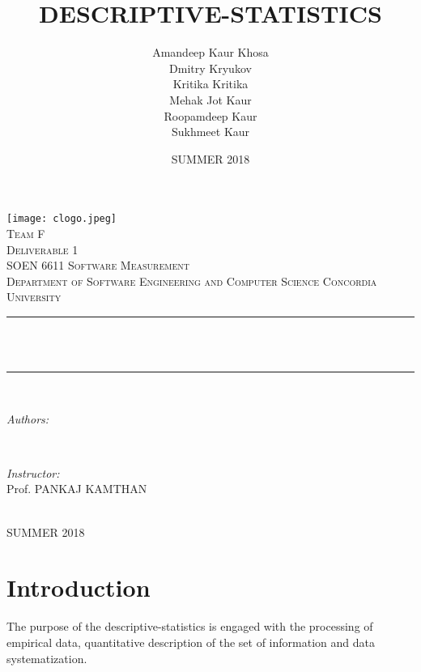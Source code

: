 \documentclass[12pt]{article}
\title{DESCRIPTIVE-STATISTICS}
\date{SUMMER 2018}
\author{
Amandeep Kaur Khosa\\
Dmitry Kryukov\\
Kritika Kritika\\
Mehak Jot Kaur\\
Roopamdeep Kaur\\
Sukhmeet Kaur
}
\begin{document}
            
\begin{titlepage}
\newcommand{\HRule}{\rule{\linewidth}{0.5mm}} 
\texttt{[image: clogo.jpeg]}\\[1cm]
\center
\textsc{\huge Team F}\\[1.0cm]
\textsc{\LARGE Deliverable 1}\\[0.5cm]
\textsc{\Large SOEN 6611 Software Measurement}\\[0.5cm]
\textsc{\large Department of Software Engineering and Computer Science Concordia University}\\[0.5cm]
\makeatletter

\HRule \\[1.0cm]
{ \huge \bfseries \@title}\\[0.5cm]
\HRule \\[1.5cm]

\begin{minipage}{0.4\textwidth}
\begin{flushleft} \large
\emph{Authors:}\\
\@author %
\end{flushleft}
\end{minipage}
~
\begin{minipage}{0.4\textwidth}
\begin{flushright} \large
\emph{Instructor:} \\
Prof. PANKAJ KAMTHAN \\[1.2em] %
\end{flushright}
\end{minipage}\\[2cm]
\makeatother
{\large SUMMER 2018}\\[2cm] 
\vfill
\end{titlepage}
\newpage
\tableofcontents
\section{Introduction}
The purpose of the descriptive-statistics is engaged with the processing of empirical data, quantitative description of the set of information and data systematization.\\
\end{document}
